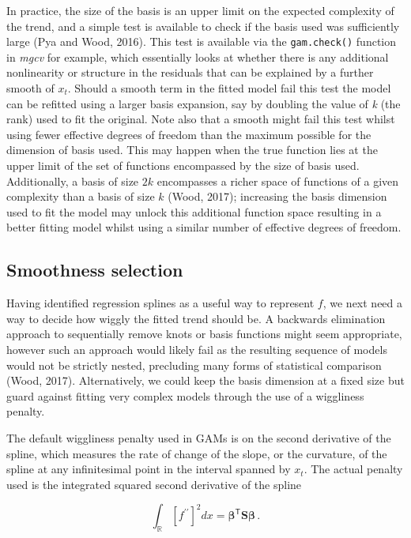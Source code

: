 \documentclass[12pt,]{article}
\begin{document}
In practice, the size of the basis is an upper limit on the expected
complexity of the trend, and a simple test is available to check if the
basis used was sufficiently large (Pya and Wood, 2016). This test is
available via the \texttt{gam.check()} function in \emph{mgcv} for
example, which essentially looks at whether there is any additional
nonlinearity or structure in the residuals that can be explained by a
further smooth of \(x_t\). Should a smooth term in the fitted model fail
this test the model can be refitted using a larger basis expansion, say
by doubling the value of \emph{k} (the rank) used to fit the original.
Note also that a smooth might fail this test whilst using fewer
effective degrees of freedom than the maximum possible for the dimension
of basis used. This may happen when the true function lies at the upper
limit of the set of functions encompassed by the size of basis used.
Additionally, a basis of size \(2k\) encompasses a richer space of
functions of a given complexity than a basis of size \(k\) (Wood, 2017);
increasing the basis dimension used to fit the model may unlock this
additional function space resulting in a better fitting model whilst
using a similar number of effective degrees of freedom.

\subsection{Smoothness selection}\label{smoothness-selection}

Having identified regression splines as a useful way to represent \(f\),
we next need a way to decide how wiggly the fitted trend should be. A
backwards elimination approach to sequentially remove knots or basis
functions might seem appropriate, however such an approach would likely
fail as the resulting sequence of models would not be strictly nested,
precluding many forms of statistical comparison (Wood, 2017).
Alternatively, we could keep the basis dimension at a fixed size but
guard against fitting very complex models through the use of a
wiggliness penalty.

The default wiggliness penalty used in GAMs is on the second derivative
of the spline, which measures the rate of change of the slope, or the
curvature, of the spline at any infinitesimal point in the interval
spanned by \(x_t\). The actual penalty used is the integrated squared
second derivative of the spline

\begin{equation} \label{eq:quadratic-penalty}
\int_{\mathbb{R}} [f^{\prime\prime}]^2 dx = \boldsymbol{\beta}^{\mathsf{T}}\mathbf{S}\boldsymbol{\beta}\, .
\end{equation}
\end{document}
